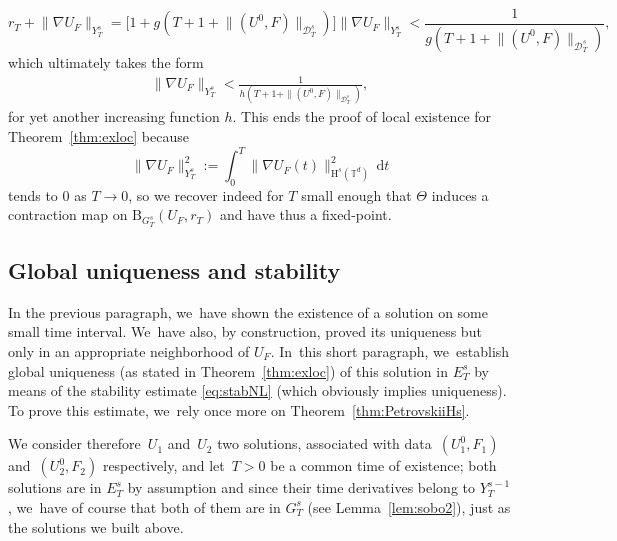 \documentclass[10pt]{amsart}
\theoremstyle{definition}
\newcommand\T{\mathbb{T}}
\newcommand\dd{\mathrm{d}}
\newcommand\B{\mathrm{B}}
\renewcommand\H{\mathrm{H}}
\begin{document}
\[
r_T \!+\! \|\nabla U_F\|_{Y_T^s} = \bigl[1\!+\!g(T\!+\!1\!+\! \| (U^0,F)\| _{\mathcal D_T^{s}})\bigr]\|\nabla U_F\|_{Y_T^s} < \frac{1}{g(T\!+\!1\!+\! \| (U^0,F)\| _{\mathcal D_T^{s}})},
\]
which ultimately takes the form
\begin{align}\label{ineq:ultimate}
\|\nabla U_F\|_{Y_T^s} < \frac{1}{h(T+1+ \| (U^0,F)\| _{\mathcal D_T^{s}})},
\end{align}
for yet another increasing function $h$. This ends the proof of local existence for Theorem~\ref{thm:exloc} because
\[
\|\nabla U_F\|_{Y_T^s}^2:= \int_0^T \|\nabla U_F(t)\|_{\H^s(\T^d)}^2\,\dd t
\]
tends to $0$ as $T\to 0$, so we recover indeed for $T$ small enough that $\Theta$ induces a contraction map on $\B_{G_T^s}(U_F,r_T)$ and have thus a fixed-point.
\subsection{Global uniqueness and stability}
In the previous paragraph, we~have shown the existence of a solution on some small time interval. We~have also, by construction, proved its uniqueness but only in an appropriate neighborhood of $U_F$. In~this short paragraph, we~establish global uniqueness (as stated in Theorem~\ref{thm:exloc}) of this solution in $E_T^s$ by means of the stability estimate \eqref{eq:stabNL} (which obviously implies uniqueness). To prove this estimate, we~rely once more on Theorem~\ref{thm:PetrovskiiHs}.

We consider therefore~$U_1$ and~$U_2$ two solutions, associated with data~$(U_1^0,F_1)$ and~$(U_2^0,F_2)$ respectively, and let~$T>0$ be a common time of existence; both solutions are in $E_T^s$ by assumption and since their time derivatives belong to $Y_T^{s-1}$, we~have of course that both of them are in $G_T^s$ (see Lemma~\ref{lem:sobo2}), just as the solutions we built above.
\end{document}
